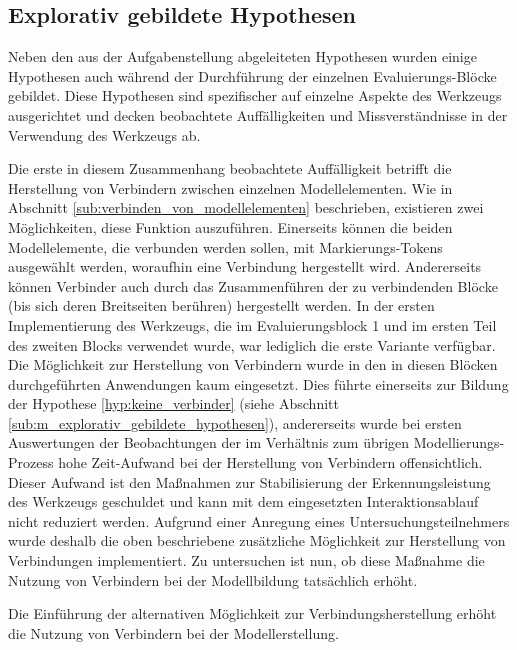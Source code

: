 
\subsection{Explorativ gebildete Hypothesen} %
\label{sub:explorativ_gebildete_hypothesen}

Neben den aus der Aufgabenstellung abgeleiteten Hypothesen wurden einige Hypothesen auch während der Durchführung der einzelnen Evaluierungs-Blöcke gebildet. Diese Hypothesen sind spezifischer auf einzelne Aspekte des Werkzeugs ausgerichtet und decken beobachtete Auffälligkeiten und Missverständnisse in der Verwendung des Werkzeugs ab. 

Die erste in diesem Zusammenhang beobachtete Auffälligkeit betrifft die Herstellung von Verbindern zwischen einzelnen Modellelementen. Wie in Abschnitt \ref{sub:verbinden_von_modellelementen} beschrieben, existieren zwei Möglichkeiten, diese Funktion auszuführen. Einerseits können die beiden Modellelemente, die verbunden werden sollen, mit Markierungs-Tokens ausgewählt werden, woraufhin eine Verbindung hergestellt wird. Andererseits können Verbinder auch durch das Zusammenführen der zu verbindenden Blöcke (bis sich deren Breitseiten berühren) hergestellt werden. In der ersten Implementierung des Werkzeugs, die im Evaluierungsblock 1 und im ersten Teil des zweiten Blocks verwendet wurde, war lediglich die erste Variante verfügbar. Die Möglichkeit zur Herstellung von Verbindern wurde in den in diesen Blöcken durchgeführten Anwendungen kaum eingesetzt. Dies führte einerseits zur Bildung der Hypothese \ref{hyp:keine_verbinder} (siehe Abschnitt \ref{sub:m_explorativ_gebildete_hypothesen}), andererseits wurde bei ersten Auswertungen der Beobachtungen der im Verhältnis zum übrigen Modellierungs-Prozess hohe Zeit-Aufwand bei der Herstellung von Verbindern offensichtlich. Dieser Aufwand ist den Maßnahmen zur Stabilisierung der Erkennungsleistung des Werkzeugs geschuldet und kann mit dem eingesetzten Interaktionsablauf nicht reduziert werden. Aufgrund einer Anregung eines Untersuchungsteilnehmers wurde deshalb die oben beschriebene zusätzliche Möglichkeit zur Herstellung von Verbindungen implementiert. Zu untersuchen ist nun, ob diese Maßnahme die Nutzung von Verbindern bei der Modellbildung tatsächlich erhöht.

\begin{hyp}
	\label{hyp:verbinder}
	Die Einführung der alternativen Möglichkeit zur Verbindungsherstellung erhöht die Nutzung von Verbindern bei der Modellerstellung.
\end{hyp}

